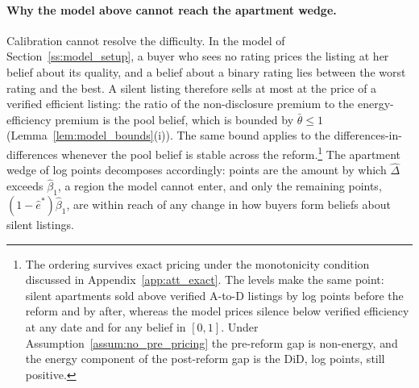 \paragraph{Why the model above cannot reach the apartment wedge.}
Calibration cannot resolve the difficulty. In the model of Section~\ref{ss:model_setup}, a buyer who sees no rating prices the listing at her belief about its quality, and a belief about a binary rating lies between the worst rating and the best. A silent listing therefore sells at most at the price of a verified efficient listing: the ratio of the non-disclosure premium to the energy-efficiency premium is the pool belief, which is bounded by $\bar\theta\le1$ (Lemma~\ref{lem:model_bounds}(i)). The same bound applies to the differences-in-differences whenever the pool belief is stable across the reform.\footnote{The ordering survives exact pricing under the monotonicity condition discussed in Appendix~\ref{app:att_exact}. The levels make the same point: silent apartments sold above verified A-to-D listings by \attLevelGapPreApt{} log points before the reform and by \attLevelGapPostApt{} after, whereas the model prices silence below verified efficiency at any date and for any belief in $[0,1]$. Under Assumption~\ref{assum:no_pre_pricing} the pre-reform gap is non-energy, and the energy component of the post-reform gap is the DiD, \attExcessApt{} log points, still positive.} The apartment wedge of \attLamApt{} log points decomposes accordingly: \attExcessApt{} points are the amount by which $\hat\Delta$ exceeds $\hat\beta_1$, a region the model cannot enter, and only the remaining \attReachApt{} points, $(1-\hat e^*)\hat\beta_1$, are within reach of any change in how buyers form beliefs about silent listings.
